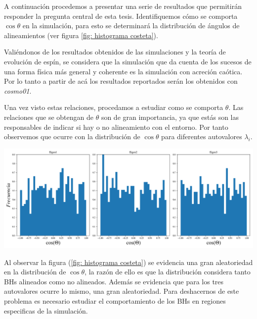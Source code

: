 
A continuación procedemos a presentar una serie de resultados que permitirán responder la pregunta central de esta tesis.
Identifiquemos cómo se comporta $\cos \theta $ en la simulación, para esto se determinará la distribución de ángulos de alineamientos (ver figura \ref{fig: histograma costeta}). 

Valiéndonos de los resultados obtenidos de las simulaciones y  la teoría de evolución de espín, se considera que la simulación que da cuenta de los sucesos de una forma física más general y coherente es la simulación con acreción caótica. Por lo tanto a partir de acá los resultados reportados serán los obtenidos con {\it{cosmo01}}. 




Una vez visto estas relaciones, procedamos a estudiar como se comporta $\theta$. Las relaciones que se obtengan de $\theta$ son de gran importancia, ya que estás son las responsables de indicar si hay o no alineamiento con el entorno. Por tanto observemos que ocurre con la distribución de $\cos \theta$ para diferentes autovalores $\lambda_{i}$.
%
\begin{center}
\includegraphics[scale=.37]{./figures/6_Resultados/cosmo01/histograma_cos_theta.png}
\label{fig: histograma costeta}
\end{center}
%
Al observar la figura (\ref{fig: histograma costeta}) se evidencia una gran aleatoriedad en la distribución de $\cos\theta$, la razón de ello es que la distribución considera tanto BHs alineados como no alineados. Además se evidencia que para los tres autovalores ocurre lo mismo, una gran aleatoriedad. Para deshacernos de este problema es necesario estudiar el comportamiento de los BHs en regiones especificas de la simulación.

